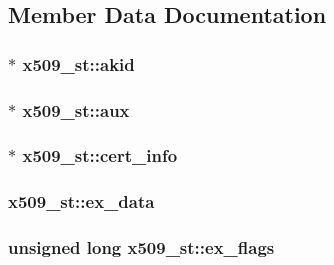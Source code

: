 \subsection{Member Data Documentation}
\subsubsection[{\texorpdfstring{akid}{akid}}]{$\ast$ x509\+\_\+st\+::akid}\hypertarget{structx509__st_a0e11914f6c1933ca2734bea95f06cf78}{}\label{structx509__st_a0e11914f6c1933ca2734bea95f06cf78}
\subsubsection[{\texorpdfstring{aux}{aux}}]{$\ast$ x509\+\_\+st\+::aux}\hypertarget{structx509__st_aa65a773dc5963a057790ccc63ca0a169}{}\label{structx509__st_aa65a773dc5963a057790ccc63ca0a169}
\subsubsection[{\texorpdfstring{cert\+\_\+info}{cert_info}}]{$\ast$ x509\+\_\+st\+::cert\+\_\+info}\hypertarget{structx509__st_abbae6a9fb14b3145b04b98f24128be71}{}\label{structx509__st_abbae6a9fb14b3145b04b98f24128be71}
\subsubsection[{\texorpdfstring{ex\+\_\+data}{ex_data}}]{ x509\+\_\+st\+::ex\+\_\+data}\hypertarget{structx509__st_a388ec405fa7f267e4ce5fbcbc9ccbc91}{}\label{structx509__st_a388ec405fa7f267e4ce5fbcbc9ccbc91}
\subsubsection[{\texorpdfstring{ex\+\_\+flags}{ex_flags}}]{\setlength{\rightskip}{0pt plus 5cm}unsigned long x509\+\_\+st\+::ex\+\_\+flags}\hypertarget{structx509__st_afc5106add019789df9b25ab6a1ff07ce}{}\label{structx509__st_afc5106add019789df9b25ab6a1ff07ce}
